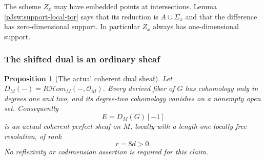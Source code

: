\documentclass[11pt]{article}
\newtheorem{proposition}[theorem]{Proposition}
\numberwithin{equation}{section}
\begin{document}
The scheme \(Z_x\) may have embedded points at intersections.
Lemma \ref{p3sw:support-local-tor} says that its reduction is
\(A\cup\Sigma_x\) and that the difference has zero-dimensional
support.  In particular \(Z_x\) always has one-dimensional support.

\subsubsection{The shifted dual is an ordinary sheaf}

\begin{proposition}[The actual coherent dual sheaf]
\label{p3sw:coherent-sheaf}
Let \(D_M(-)=R\mathcal Hom_M(-,\mathcal O_M)\).  Every derived fiber
of \(G\) has cohomology only in degrees one and two, and its
degree-two cohomology vanishes on a nonempty open set.  Consequently
\begin{equation}
 E=D_M(G)[-1]
 \label{p3sw:support-dual-sheaf}
\end{equation}
is an actual coherent perfect sheaf on \(M\), locally with a
length-one locally free resolution, of rank
\begin{equation}
 r=8d>0.
 \label{p3sw:support-rank}
\end{equation}
No reflexivity or codimension assertion is required for this claim.
\end{proposition}
\end{document}
